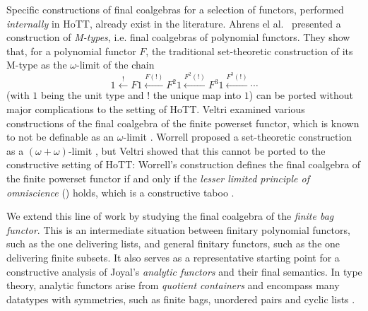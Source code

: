 \documentclass[final,a4paper,USenglish,cleveref]{lipics-v2021}
\begin{document}
Specific constructions of final coalgebras for a selection of functors, performed \emph{internally} in HoTT, already exist in the literature. Ahrens el al.~\cite{Ahrens2015} presented a construction of \emph{M-types}, i.e. final coalgebras of polynomial functors. They show that, for a polynomial functor $F$, the traditional set-theoretic construction of its M-type as the $\omega$-limit of the chain
\begin{equation}\label{eq:chain}
    1 \xleftarrow{!} {F 1}
      \xleftarrow{F(!)} {F^2 1}
      \xleftarrow{F^2(!)} {F^3 1}
      \xleftarrow{F^3(!)}
      \cdots
\end{equation}
(with $1$ being the unit type and $!$ the unique map into $1$) can be ported without major complications to the setting of HoTT. Veltri \cite{Veltri2021} examined various constructions of the final coalgebra of the finite powerset functor, which is known to not be definable as an $\omega$-limit \cite{Adamek1995}. Worrell proposed a set-theoretic construction as a $(\omega+\omega)$-limit \cite{Worrell2005}, but Veltri showed that this cannot be ported to the constructive setting of HoTT: Worrell's construction defines the final coalgebra of the finite powerset functor if and only if the \emph{lesser limited principle of omniscience} (\LLPO{}) holds, which is a constructive taboo \cite{Bridges1987}.


We extend this line of work by studying the final coalgebra of the \emph{finite bag functor}. This is an intermediate situation between finitary polynomial functors, such as the one delivering lists, and general finitary functors, such as the one delivering finite subsets. It also serves as a representative starting point for a constructive analysis of Joyal's \emph{analytic functors} \cite{Joyal1986} and their final semantics. In type theory, analytic functors arise from \emph{quotient containers} \cite{Abbott2004} and encompass many datatypes with symmetries, such as finite bags, unordered pairs and cyclic lists \cite{Yorgey2010,Yorgey2014}.
\end{document}
